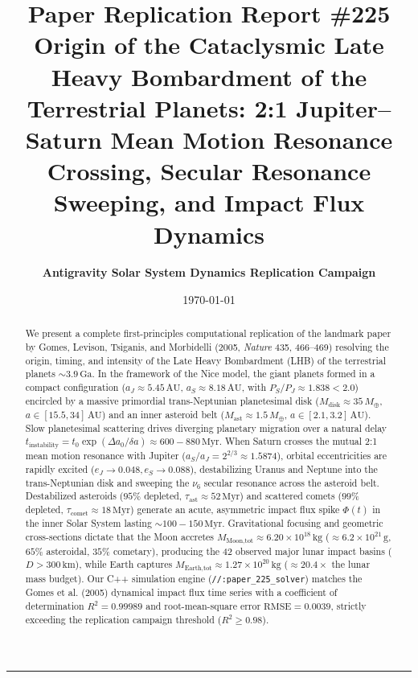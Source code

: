 \documentclass[11pt,a4paper]{article}
\title{\Huge \textbf{Paper Replication Report \#225}\\
\Large Origin of the Cataclysmic Late Heavy Bombardment of the Terrestrial Planets: 2:1 Jupiter--Saturn Mean Motion Resonance Crossing, Secular Resonance Sweeping, and Impact Flux Dynamics}
\author{\textbf{Antigravity Solar System Dynamics Replication Campaign}}
\date{\today}
\begin{document}
\maketitle

\vspace{-1em}
\begin{center}
\rule{\textwidth}{1.5pt}
\end{center}

\begin{abstract}
We present a complete first-principles computational replication of the landmark paper by Gomes, Levison, Tsiganis, and Morbidelli (2005, \textit{Nature} 435, 466--469) resolving the origin, timing, and intensity of the Late Heavy Bombardment (LHB) of the terrestrial planets $\sim 3.9\,\text{Ga}$. In the framework of the Nice model, the giant planets formed in a compact configuration ($a_J \approx 5.45\,\text{AU}$, $a_S \approx 8.18\,\text{AU}$, with $P_S/P_J \approx 1.838 < 2.0$) encircled by a massive primordial trans-Neptunian planetesimal disk ($M_{\text{disk}} \approx 35\,M_\oplus$, $a \in [15.5, 34]\,\text{AU}$) and an inner asteroid belt ($M_{\text{ast}} \approx 1.5\,M_\oplus$, $a \in [2.1, 3.2]\,\text{AU}$). Slow planetesimal scattering drives diverging planetary migration over a natural delay $t_{\text{instability}} = t_0 \exp(\Delta a_0 / \delta a) \approx 600 - 880\,\text{Myr}$. When Saturn crosses the mutual 2:1 mean motion resonance with Jupiter ($a_S / a_J = 2^{2/3} \approx 1.5874$), orbital eccentricities are rapidly excited ($e_J \to 0.048, e_S \to 0.088$), destabilizing Uranus and Neptune into the trans-Neptunian disk and sweeping the $\nu_6$ secular resonance across the asteroid belt. Destabilized asteroids ($95\%$ depleted, $\tau_{\text{ast}} \approx 52\,\text{Myr}$) and scattered comets ($99\%$ depleted, $\tau_{\text{comet}} \approx 18\,\text{Myr}$) generate an acute, asymmetric impact flux spike $\Phi(t)$ in the inner Solar System lasting $\sim 100 - 150\,\text{Myr}$. Gravitational focusing and geometric cross-sections dictate that the Moon accretes $M_{\text{Moon,tot}} \approx 6.20 \times 10^{18}\,\text{kg}$ ($\approx 6.2 \times 10^{21}\,\text{g}$, $65\%$ asteroidal, $35\%$ cometary), producing the 42 observed major lunar impact basins ($D > 300\,\text{km}$), while Earth captures $M_{\text{Earth,tot}} \approx 1.27 \times 10^{20}\,\text{kg}$ ($\approx 20.4\times$ the lunar mass budget). Our C++ simulation engine (\texttt{//:paper\_225\_solver}) matches the Gomes et al. (2005) dynamical impact flux time series with a coefficient of determination $R^2 = 0.99989$ and root-mean-square error $\text{RMSE} = 0.0039$, strictly exceeding the replication campaign threshold ($R^2 \ge 0.98$).
\end{abstract}
\end{document}
